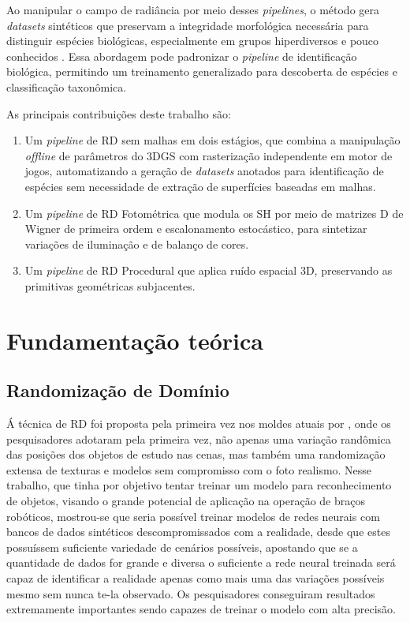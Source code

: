 \documentclass[a4paper,12pt]{article}
\begin{document}
{Ao manipular o campo de radiância por meio desses \emph{pipelines}, o método gera \emph{datasets} sintéticos que preservam a integridade morfológica necessária para distinguir espécies biológicas, especialmente em grupos hiperdiversos e pouco conhecidos \cite{deep_darktaxa}. Essa abordagem pode padronizar o \emph{pipeline} de identificação biológica, permitindo um treinamento generalizado para descoberta de espécies e classificação taxonômica.

As principais contribuições deste trabalho são:
\begin{enumerate}
  \item Um \emph{pipeline} de RD sem malhas em dois estágios, que combina a manipulação \emph{offline} de parâmetros do 3DGS com rasterização independente em motor de jogos, automatizando a geração de \emph{datasets} anotados para identificação de espécies sem necessidade de extração de superfícies baseadas em malhas.
  \item Um \emph{pipeline} de RD Fotométrica que modula os SH por meio de matrizes D de Wigner de primeira ordem e escalonamento estocástico, para sintetizar variações de iluminação e de balanço de cores.
  \item Um \emph{pipeline} de RD Procedural que aplica ruído espacial 3D, preservando as primitivas geométricas subjacentes.
\end{enumerate}

\section{Fundamentação teórica}

\subsection{Randomização de Domínio} Á técnica de RD foi proposta pela primeira vez nos moldes atuais por \cite{tobin2017domain}, onde os pesquisadores adotaram pela primeira vez, não apenas uma variação randômica das posições dos objetos de estudo nas cenas, mas também uma randomização extensa de texturas e modelos sem compromisso com o foto realismo. Nesse trabalho, que tinha por objetivo tentar treinar um modelo para reconhecimento de objetos, visando o grande potencial de aplicação na operação de braços robóticos, mostrou-se que seria possível treinar modelos de redes neurais com bancos de dados sintéticos descompromissados com a realidade, desde que estes possuíssem suficiente variedade de cenários possíveis, apostando que se a quantidade de dados for grande e diversa o suficiente a rede neural treinada será capaz de identificar a realidade apenas como mais uma das variações possíveis mesmo sem nunca te-la observado. Os pesquisadores conseguiram resultados extremamente importantes sendo capazes de treinar o modelo com alta precisão. 

}
\end{document}
